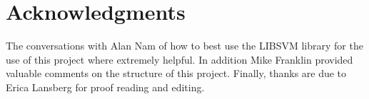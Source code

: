 \section*{Acknowledgments}
The conversations with Alan Nam of how to best use the LIBSVM library for the use of this project where extremely helpful.
In addition Mike Franklin provided valuable comments on the structure of this project.
Finally, thanks are due to Erica Lansberg for proof reading and editing.

